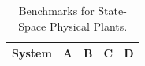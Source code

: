 \documentclass[runningheads,a4paper]{llncs}
\begin{document}
\begin{table}[htb]
\centering
\footnotesize
\caption{Benchmarks for State-Space Physical Plants.}
\label{table:State-space-benchmarks}
\begin{tabular}{|c|c|c|c|c|}
\hline
\textbf{System}                                                               & \textbf{A} & \textbf{B} & \textbf{C} & \textbf{D} \\ \hline

\end{tabular}
\end{table}
\end{document}
